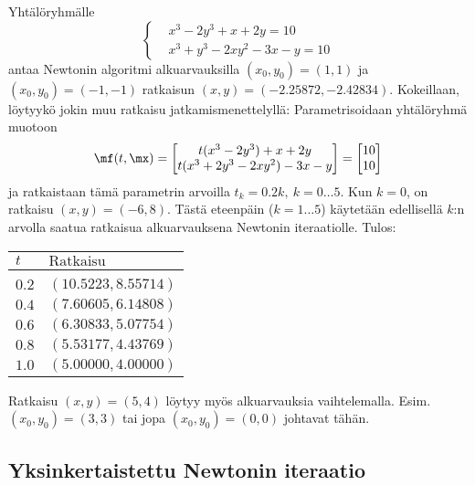 \begin{Exa} Yhtälöryhmälle %
\[
\left\{ \begin{aligned}
        &x^3-2y^3+x+2y=10 \\ &x^3+y^3-2xy^2-3x-y=10
        \end{aligned} \right.
\]
antaa Newtonin algoritmi alkuarvauksilla $(x_0,y_0)=(1,1)$ ja $(x_0,y_0)=(-1,-1)$ ratkaisun
$(x,y)=(-2.25872,-2.42834)$. Kokeillaan, löytyykö jokin muu ratkaisu jatkamismenettelyllä:
Parametrisoidaan yhtälöryhmä muotoon
\[
\mf(t,\mx) = \begin{bmatrix}
             t(x^3-2y^3)+x+2y \\ t(x^3+2y^3-2xy^2)-3x-y
             \end{bmatrix}
           = \begin{bmatrix} 10\\10 \end{bmatrix}
\]
ja ratkaistaan tämä parametrin arvoilla $t_k=0.2k,\ k=0 \ldots 5$. Kun $k=0$, on ratkaisu
$(x,y)=(-6,8)$. Tästä eteenpäin ($k=1 \ldots 5$) käytetään edellisellä $k$:n arvolla saatua
ratkaisua alkuarvauksena Newtonin iteraatiolle. Tulos:
\begin{center}
\begin{tabular}{ll}
$t$   & $\text{Ratkaisu}$  \\ \hline \\
$0.2$ & $(10.5223,8.55714)$ \\
$0.4$ & $(7.60605,6.14808)$ \\
$0.6$ & $(6.30833,5.07754)$ \\
$0.8$ & $(5.53177,4.43769)$ \\
$1.0$ & $(5.00000,4.00000)$
\end{tabular}
\end{center}
Ratkaisu $(x,y)=(5,4)$ löytyy myös alkuarvauksia vaihtelemalla. Esim.\ $(x_0,y_0)=(3,3)$ tai
jopa $(x_0,y_0)=(0,0)$ johtavat tähän. \loppu
\end{Exa}

\subsection*{Yksinkertaistettu Newtonin iteraatio}
 
